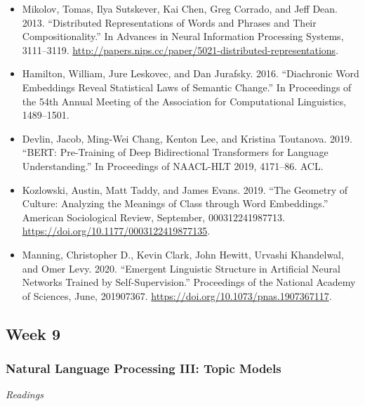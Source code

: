 \documentclass[
  10pt,
]{article}
\providecommand{\tightlist}{%
  \setlength{\itemsep}{0pt}\setlength{\parskip}{0pt}}
\begin{document}
\begin{itemize}
\tightlist
\item
  Mikolov, Tomas, Ilya Sutskever, Kai Chen, Greg Corrado, and Jeff Dean.
  2013. ``Distributed Representations of Words and Phrases and Their
  Compositionality.'' In Advances in Neural Information Processing
  Systems, 3111--3119.
  \url{http://papers.nips.cc/paper/5021-distributed-representations}.
\item
  Hamilton, William, Jure Leskovec, and Dan Jurafsky. 2016. ``Diachronic
  Word Embeddings Reveal Statistical Laws of Semantic Change.'' In
  Proceedings of the 54th Annual Meeting of the Association for
  Computational Linguistics, 1489--1501.
\item
  Devlin, Jacob, Ming-Wei Chang, Kenton Lee, and Kristina Toutanova.
  2019. ``BERT: Pre-Training of Deep Bidirectional Transformers for
  Language Understanding.'' In Proceedings of NAACL-HLT 2019, 4171--86.
  ACL.
\item
  Kozlowski, Austin, Matt Taddy, and James Evans. 2019. ``The Geometry
  of Culture: Analyzing the Meanings of Class through Word Embeddings.''
  American Sociological Review, September, 000312241987713.
  \url{https://doi.org/10.1177/0003122419877135}.
\item
  Manning, Christopher D., Kevin Clark, John Hewitt, Urvashi Khandelwal,
  and Omer Levy. 2020. ``Emergent Linguistic Structure in Artificial
  Neural Networks Trained by Self-Supervision.'' Proceedings of the
  National Academy of Sciences, June, 201907367.
  \url{https://doi.org/10.1073/pnas.1907367117}.
\end{itemize}

\hypertarget{week-9}{%
\subsection{Week 9}\label{week-9}}

\hypertarget{natural-language-processing-iii-topic-models}{%
\subsubsection{Natural Language Processing III: Topic
Models}\label{natural-language-processing-iii-topic-models}}

\emph{Readings}
\end{document}
